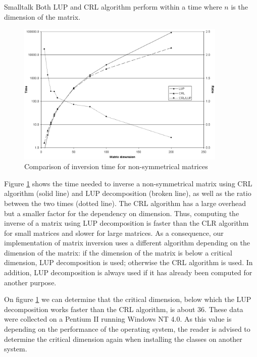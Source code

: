 \begin{displaycode}{Smalltalk}
Both LUP and CRL algorithm perform within a time  where
$n$ is the dimension of the matrix.
\begin{figure}
\centering\includegraphics[width=10cm]{Figures/InversionTime}
\caption{Comparison of inversion time for non-symmetrical
matrices}\label{fig:inversionTime}
\end{figure}
Figure \ref{fig:inversionTime} shows the time needed to inverse a
non-symmetrical matrix using CRL algorithm (solid line) and LUP
decomposition (broken line), as well as the ratio between the two
times (dotted line). The CRL algorithm has a large overhead but a
smaller factor for the dependency on dimension. Thus, computing
the inverse of a matrix using LUP decomposition is faster than the
CLR algorithm for small matrices and slower for large matrices. As
a consequence, our implementation of matrix inversion uses a
different algorithm depending on the dimension of the matrix: if
the dimension of the matrix is below a critical dimension, LUP
decomposition is used; otherwise the CRL algorithm is used. In
addition, LUP decomposition is always used if it has already been
computed for another purpose.

On figure \ref{fig:inversionTime} we can determine that the
critical dimension, below which the LUP decomposition works faster
than the CRL algorithm, is about $36$. These data were collected on
a Pentium II running Windows NT 4.0. As this value is depending on
the performance of the operating system, the reader is advised to
determine the critical dimension again when installing the classes
on another system.


\end{displaycode}
